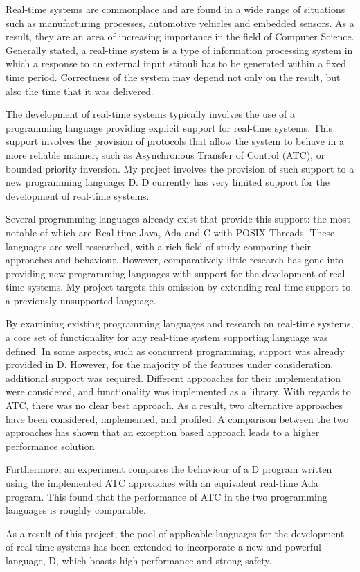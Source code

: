 
Real-time systems are commonplace and are found in a wide range of 
situations such as manufacturing processes, automotive vehicles and embedded 
sensors. As a result, they are an area of increasing importance in the field 
of Computer Science. Generally stated, a real-time system is a type of information 
processing system in which a response to an external input stimuli 
has to be generated within a fixed time period. Correctness of the 
system may depend not only on the result, but also the time that it was delivered. 
\par\bigskip\noindent
The development of real-time systems typically involves the use of a programming 
language providing explicit support for real-time systems. 
This support involves the provision of protocols that allow the system to 
behave in a more reliable manner, such as Asynchronous Transfer of Control
(ATC), or bounded priority inversion. 
My project involves the provision of such support to a new programming language: 
D. D currently has very limited support for the development of real-time systems. 
\par\bigskip\noindent
Several programming languages already exist that provide this support:
the most notable of which are 
Real-time Java, Ada and C with POSIX Threads. These languages are well researched, 
with a rich field of study comparing their approaches and behaviour. 
However, comparatively little research has gone into providing new programming 
languages with support for the development of real-time systems. My project 
targets this omission by extending real-time support to a previously unsupported 
language.
\par\bigskip\noindent
By examining existing programming languages and research on real-time systems, a core set 
of functionality for any real-time system supporting language was defined. 
In some aspects, such as concurrent programming, support was already provided in D. 
However, for the majority of the features under consideration, additional support was required. 
Different approaches for their implementation were considered, and functionality 
was implemented as a library. 
With regards to ATC, there was no clear 
best approach. As a result, two alternative approaches have 
been considered, implemented, and profiled. A comparison between the two approaches 
has shown that an exception based approach leads to a higher performance 
solution. 
\par\bigskip\noindent
Furthermore, an experiment compares the behaviour of a D program written 
using the implemented ATC approaches with an equivalent 
real-time Ada program. This found that the performance of ATC in the two 
programming languages is roughly comparable. 
\par\bigskip\noindent
As a result of this project, the pool of applicable languages for the development 
of real-time systems has been extended to incorporate a new and powerful language, D, which 
boasts high performance and strong safety. 
